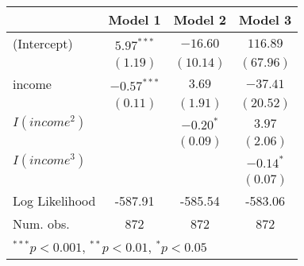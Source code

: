 
\begin{table}[hb!]
\footnotesize
\begin{center}
\begin{tabular}{l c c c }
\toprule
 & Model 1 & Model 2 & Model 3 \\
\midrule
(Intercept)    & $5.97^{***}$  & $-16.60$    & $116.89$    \\
               & $(1.19)$      & $(10.14)$   & $(67.96)$   \\
income         & $-0.57^{***}$ & $3.69$      & $-37.41$    \\
               & $(0.11)$      & $(1.91)$    & $(20.52)$   \\
$I(income^2)$    &               & $-0.20^{*}$ & $3.97$      \\
               &               & $(0.09)$    & $(2.06)$    \\
$I(income^3)$    &               &             & $-0.14^{*}$ \\
               &               &             & $(0.07)$    \\
\midrule
Log Likelihood & -587.91       & -585.54     & -583.06     \\
Num. obs.      & 872           & 872         & 872         \\
\bottomrule
\multicolumn{4}{l}{\scriptsize{$^{***}p<0.001$, $^{**}p<0.01$, $^*p<0.05$}}
\end{tabular}
\label{table:coefficients}
\end{center}
\end{table}
